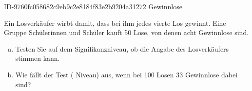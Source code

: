 \begin{exercise}
      {ID-9760fc058682c9eb9c2e8184f83e2b9204a31272}
      {Gewinnlose}
  \ifproblem\problem\par
    Ein Losverkäufer wirbt damit, dass bei ihm jedes vierte Los gewinnt.
    Eine Gruppe Schülerinnen und Schüler kauft 50 Lose, von denen acht
    Gewinnlose sind.
    \begin{enumerate}[a)]
      \item Testen Sie auf dem  Signifikanzniveau, ob die Angabe des
            Losverkäufers stimmen kann.
      \item Wie fällt der Test ( Niveau) aus, wenn bei 100 Losen 33
            Gewinnlose dabei sind?
    \end{enumerate}
  \fi
\end{exercise}
